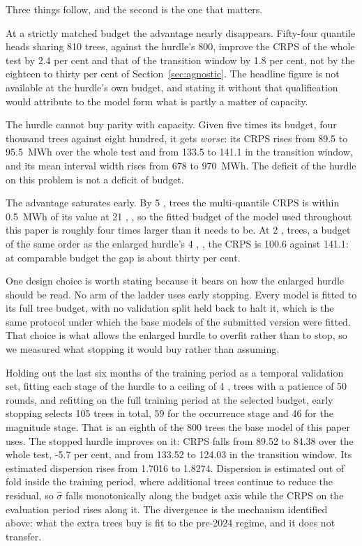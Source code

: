 \documentclass[preprint,3p,times]{elsarticle}
\providecommand{\DIFaddtex}[1]{{\protect\color{blue} \sf #1}} %
\providecommand{\DIFadd}[1]{\texorpdfstring{\DIFaddtex{#1}}{#1}} %
\begin{document}


\DIFadd{Three things follow, and the second is the one that matters.
}

\DIFadd{At a strictly matched budget the advantage nearly disappears. Fifty-four quantile heads sharing 810 trees, against the hurdle's 800, improve the CRPS of the whole test by 2.4 per cent and that of the transition window by 1.8 per cent, not by the eighteen to thirty per cent of Section~\ref{sec:agnostic}. The headline figure is not available at the hurdle's own budget, and stating it without that qualification would attribute to the model form what is partly a matter of capacity.
}

\DIFadd{The hurdle cannot buy parity with capacity. Given five times its budget, four thousand trees against eight hundred, it gets \emph{worse}: its CRPS rises from 89.5 to 95.5~MWh over the whole test and from 133.5 to 141.1 in the transition window, and its mean interval width rises from 678 to 970~MWh. The deficit of the hurdle on this problem is not a deficit of budget.
}

\DIFadd{The advantage saturates early. By 5}{\DIFadd{,}}\DIFadd{400 trees the multi-quantile CRPS is within 0.5~MWh of its value at 21}{\DIFadd{,}}\DIFadd{600, so the fitted budget of the model used throughout this paper is roughly four times larger than it needs to be. At 2}{\DIFadd{,}}\DIFadd{700 trees, a budget of the same order as the enlarged hurdle's 4}{\DIFadd{,}}\DIFadd{000, the CRPS is 100.6 against 141.1: at comparable budget the gap is about thirty per cent.
}

\DIFadd{One design choice is worth stating because it bears on how the enlarged hurdle should be read. No arm of the ladder uses early stopping. Every model is fitted to its full tree budget, with no validation split held back to halt it, which is the same protocol under which the base models of the submitted version were fitted. That choice is what allows the enlarged hurdle to overfit rather than to stop, so we measured what stopping it would buy rather than assuming.
}

\DIFadd{Holding out the last six months of the training period as a temporal validation set, fitting each stage of the hurdle to a ceiling of 4}{\DIFadd{,}}\DIFadd{000 trees with a patience of 50 rounds, and refitting on the full training period at the selected budget, early stopping selects 105 trees in total, 59 for the occurrence stage and 46 for the magnitude stage. That is an eighth of the 800 trees the base model of this paper uses. The stopped hurdle improves on it: CRPS falls from 89.52 to 84.38 over the whole test, -5.7 per cent, and from 133.52 to 124.03 in the transition window. Its estimated dispersion rises from 1.7016 to 1.8274. Dispersion is estimated out of fold inside the training period, where additional trees continue to reduce the residual, so $\hat\sigma$ falls monotonically along the budget axis while the CRPS on the evaluation period rises along it. The divergence is the mechanism identified above: what the extra trees buy is fit to the pre-2024 regime, and it does not transfer.
}
\end{document}
